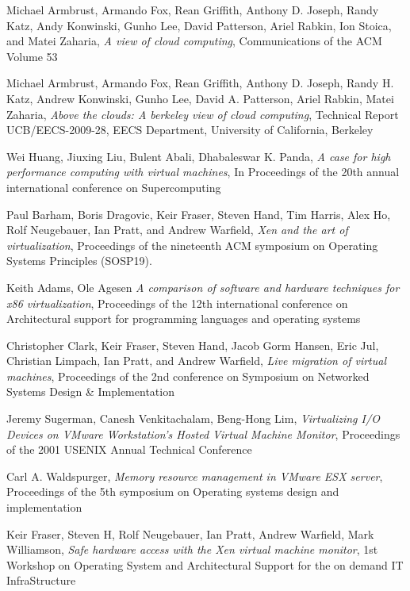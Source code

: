\begin{thebibliography}{99}

 Michael Armbrust, Armando Fox, Rean Griffith,
  Anthony D. Joseph, Randy Katz, Andy Konwinski, Gunho Lee, David
  Patterson, Ariel Rabkin, Ion Stoica, and Matei Zaharia, \emph{A view
    of cloud computing}, Communications of the ACM Volume 53

 Michael Armbrust, Armando Fox, Rean
  Griffith, Anthony D. Joseph, Randy H. Katz, Andrew Konwinski, Gunho
  Lee, David A. Patterson, Ariel Rabkin, Matei Zaharia, \emph{Above
    the clouds: A berkeley view of cloud computing}, Technical Report
  UCB/EECS-2009-28, EECS Department, University of California,
  Berkeley

 Wei Huang, Jiuxing Liu, Bulent Abali, Dhabaleswar
  K. Panda, \emph{A case for high performance computing with virtual
    machines}, In Proceedings of the 20th annual international
  conference on Supercomputing

 Paul Barham, Boris Dragovic, Keir Fraser, Steven
  Hand, Tim Harris, Alex Ho, Rolf Neugebauer, Ian Pratt, and Andrew
  Warfield, \emph{Xen and the art of virtualization}, Proceedings of
  the nineteenth ACM symposium on Operating Systems Principles
  (SOSP19).

 Keith Adams, Ole Agesen \emph{A comparison of
    software and hardware techniques for x86 virtualization},
  Proceedings of the 12th international conference on Architectural
  support for programming languages and operating systems

 Christopher Clark, Keir Fraser, Steven Hand, Jacob Gorm
  Hansen, Eric Jul, Christian Limpach, Ian Pratt, and Andrew Warfield,
  \emph{Live migration of virtual machines}, Proceedings of the 2nd
  conference on Symposium on Networked Systems Design \& Implementation

 Jeremy Sugerman, Canesh Venkitachalam, Beng-Hong
  Lim, \emph{Virtualizing I/O Devices on VMware Workstation's Hosted
    Virtual Machine Monitor}, Proceedings of the 2001 USENIX Annual
  Technical Conference

 Carl A. Waldspurger, \emph{Memory resource
    management in VMware ESX server}, Proceedings of the 5th symposium
  on Operating systems design and implementation

 Keir Fraser, Steven H, Rolf Neugebauer, Ian
  Pratt, Andrew Warfield, Mark Williamson, \emph{Safe hardware access
    with the Xen virtual machine monitor}, 1st Workshop on Operating
  System and Architectural Support for the on demand IT InfraStructure


\end{thebibliography}

